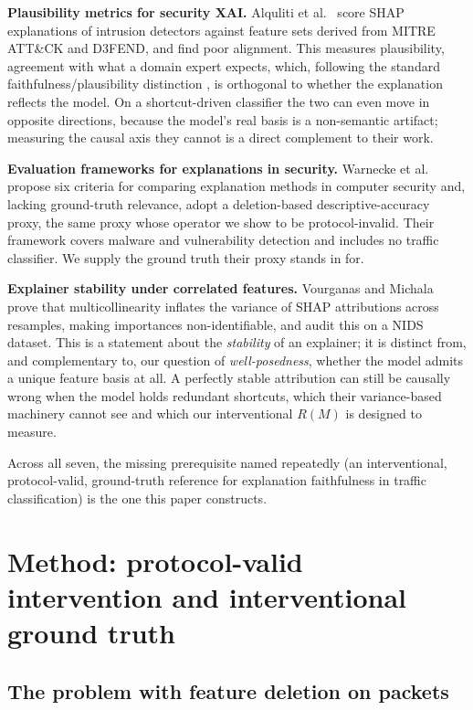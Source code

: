 \documentclass[journal]{IEEEtran}
\begin{document}
\textbf{Plausibility metrics for security XAI.} Alquliti et
al.~\cite{alquliti2025evaluating} score SHAP explanations of intrusion
detectors against feature sets derived from MITRE ATT\&CK and D3FEND,
and find poor alignment. This measures plausibility, agreement with what
a domain expert expects, which, following the standard
faithfulness/plausibility distinction \cite{jacovi2020towards}, is
orthogonal to whether the explanation reflects the model. On a
shortcut-driven classifier the two can even move in opposite directions,
because the model's real basis is a non-semantic artifact; measuring the
causal axis they cannot is a direct complement to their work.

\textbf{Evaluation frameworks for explanations in security.} Warnecke et
al.~\cite{warnecke2020evaluating} propose six criteria for comparing
explanation methods in computer security and, lacking ground-truth
relevance, adopt a deletion-based descriptive-accuracy proxy, the same
proxy whose operator we show to be protocol-invalid. Their framework
covers malware and vulnerability detection and includes no traffic
classifier. We supply the ground truth their proxy stands in for.

\textbf{Explainer stability under correlated features.} Vourganas and
Michala \cite{vourganas2026stabilising} prove that multicollinearity
inflates the variance of SHAP attributions across resamples, making
importances non-identifiable, and audit this on a NIDS dataset. This is
a statement about the \emph{stability} of an explainer; it is distinct
from, and complementary to, our question of \emph{well-posedness},
whether the model admits a unique feature basis at all. A perfectly
stable attribution can still be causally wrong when the model holds
redundant shortcuts, which their variance-based machinery cannot see and
which our interventional $R(M)$ is designed to measure.

Across all seven, the missing prerequisite named repeatedly (an
interventional, protocol-valid, ground-truth reference for explanation
faithfulness in traffic classification) is the one this paper
constructs.

\section{Method: protocol-valid intervention and interventional ground
truth}

\subsection{The problem with feature deletion on packets}
\end{document}
